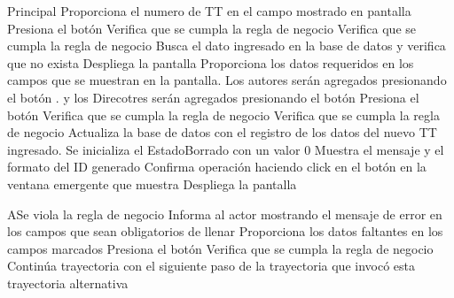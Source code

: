 
\begin{UCtrayectoria}{Principal}
		\UCpaso[\UCactor] Proporciona el numero de TT en el campo mostrado en pantalla 
		\UCpaso[\UCactor] Presiona el botón  
		\UCpaso[\UCsist] Verifica que se cumpla la regla de negocio  
		\UCpaso[\UCsist] Verifica que se cumpla la regla de negocio  
		\UCpaso[\UCsist] Busca el dato ingresado en la base de datos  y verifica que no exista 
		\UCpaso[\UCsist] Despliega la pantalla 
		\UCpaso[\UCactor] Proporciona los datos requeridos en los campos que se muestran en la pantalla. Los autores serán agregados presionando el botón . y los Direcotres serán agregados presionando el botón 
		\UCpaso[\UCactor] Presiona el botón  
		\UCpaso[\UCsist] Verifica que se cumpla la regla de negocio  
		\UCpaso[\UCsist] Verifica que se cumpla la regla de negocio  
		\UCpaso[\UCsist] Actualiza la base de datos con el registro de los datos del nuevo TT ingresado. Se inicializa el EstadoBorrado con un valor 0
		\UCpaso[\UCsist] Muestra el mensaje  y el formato del ID generado
		\UCpaso[\UCactor] Confirma operación haciendo click en el botón  en la ventana emergente que muestra
		\UCpaso[\UCsist] Despliega la pantalla 
\end{UCtrayectoria}



\begin{UCtrayectoriaA}{A}{Se viola la regla de negocio }	
			\UCpaso[\UCsist] Informa al actor mostrando el mensaje de error  en los campos que sean obligatorios de llenar
			\UCpaso[\UCactor] Proporciona los datos faltantes en los campos marcados 
			\UCpaso[\UCactor] Presiona el botón  
			\UCpaso[\UCactor] Verifica que se cumpla la regla de negocio  
			\UCpaso[\UCsist] Continúa trayectoria con el siguiente paso de la trayectoria que invocó esta trayectoria alternativa
\end{UCtrayectoriaA}

